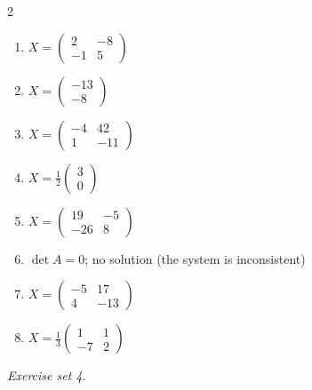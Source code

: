 \begin{multicols}{2}
\begin{enumerate}[label=\arabic*., leftmargin=*, itemsep=1pt]
\item $X=\left(\begin{smallmatrix}2 & -8\\ -1 & 5\end{smallmatrix}\right)$
\item $X=\left(\begin{smallmatrix}-13\\ -8\end{smallmatrix}\right)$
\item $X=\left(\begin{smallmatrix}-4 & 42\\ 1 & -11\end{smallmatrix}\right)$
\item $X=\frac{1}{2}\left(\begin{smallmatrix}3\\ 0\end{smallmatrix}\right)$
\item $X=\left(\begin{smallmatrix}19 & -5\\ -26 & 8\end{smallmatrix}\right)$
\item $\det A=0$; no solution (the system is inconsistent)
\item $X=\left(\begin{smallmatrix}-5 & 17\\ 4 & -13\end{smallmatrix}\right)$
\item $X=\frac{1}{3}\left(\begin{smallmatrix}1 & 1\\ -7 & 2\end{smallmatrix}\right)$
\end{enumerate}
\end{multicols}
\par\noindent\emph{Exercise set 4.}\nopagebreak
